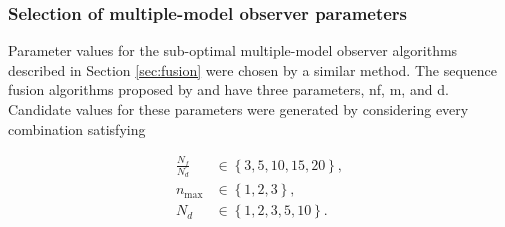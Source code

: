 \subsubsection{Selection of multiple-model observer parameters} \label{sec:sim-obs-lin-1-MKF-tuning}

Parameter values for the sub-optimal multiple-model observer algorithms described in Section \ref{sec:fusion} were chosen by a similar method. The sequence fusion algorithms proposed by \cite{robertson_detection_1995} and \cite{robertson_method_1998} have three parameters, \gls{nf}, \gls{m}, and \gls{d}. Candidate values for these parameters were generated by considering every combination satisfying

\begin{equation} \label{eq:sim-sys-siso-MKF-SF-param-values}
	\begin{aligned}
		\frac{N_f}{N_d} &\in \left\{3, 5, 10, 15, 20\right\},  \\
		n_\text{max} &\in \left\{1, 2, 3\right\},  \\
		N_d &\in \left\{1, 2, 3, 5, 10\right\}.
	\end{aligned}
\end{equation}

